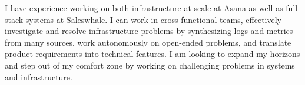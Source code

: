 

\begin{cvparagraph}

  I have experience working on both infrastructure at scale at Asana as well as full-stack systems at Saleswhale. I can work in cross-functional teams, effectively investigate and resolve infrastructure problems by synthesizing logs and metrics from many sources, work autonomously on open-ended problems, and translate product requirements into technical features. I am looking to expand my horizons and step out of my comfort zone by working on challenging problems in systems and infrastructure.
\end{cvparagraph}
